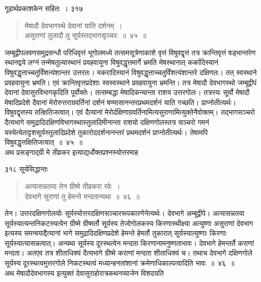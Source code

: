 \documentclass[11pt, openany]{book}
\begin{document}
\newpage


\hspace{3cm} गूढार्थप्रकाशकेन सहितः~। \hfill ३१७
\vspace{1cm}


\begin{quote}
 {\ssi मेषादौ देवभागस्थे देवानां याति दर्शनम्~।\\ 
असुराणां तुलादौ तु सूर्यस्तद्भागसृञ्चरः~॥~४५~॥}
\end{quote}

 जम्बूद्वीपलवणसमुद्रसन्धौ परिधिवृत्तं भूगोलमध्मे तत्समसूत्रेणाकाशे वृत्तं विषुवद्वृत्तं तत्र क्रान्तिवृत्तं षड्भान्तरेण स्थानद्वये लग्नं तन्मेषतुल्यास्थानं प्रवहवायुना विषुवद्धृत्तमार्गे भ्रमति मेषस्थानात् कर्कादिस्यानं विषुवद्धृत्ताच्चतुर्विंशत्यंशान्तर उत्तरतः। मकरादिस्यानं विषुवद्धृत्ताच्चतुर्विंशत्यंशान्तरे दक्षिणतः। तत् स्वस्थाने प्रवहवायुना भ्रमति। एवं क्रान्तिवृत्तप्रदेशाः स्वस्वस्थाने प्रवहवायुना भ्रमन्ति। तत्र मेषादौ देवभागस्थो जम्बूद्वीपं देवानां देवासुरविभागकृदिति पूर्वोक्तेः। तत्सम्बद्धा मेषादिकन्यान्ता राशय उत्तरगोलः। तत्रस्यः सूर्यो मेषादौ मेषादिप्रदेशे दैवानां मेरोरुत्तराग्रवर्तिनां दर्शनं षण्मासानन्तरप्रथमदर्शनं याति गच्छति। प्राप्नोतीत्यर्थः। विषुवद्वृत्तस्य तत्क्षितिजत्वात्। एवं दैत्यानां मेरोर्दक्षिणाग्रवर्तिनामित्यसुराणामित्युक्तेनैवोक्तम्। तद्भागसञ्चरो दैत्यभागे समुद्रादिदक्षिणविभागस्थास्तुलादिमीनान्ता राशयो दक्षिणगोलस्तत्र सञ्चरो गमनं यस्येत्येताट्टशसूर्यस्तुलादिप्रदेशे तुकारोददर्शनानन्तरं प्रथमदर्शनं प्राप्नोतीत्यर्थः। तेषामपि विषुवद्धृत्तक्षितिजत्वात्~॥~४५~॥\\
\noindent अथ प्रसङ्गाद्ग्री मे तीव्रकर इत्याद्यर्धोक्तप्रश्नस्योत्तरमाह\textendash 



\newpage


\noindent ३१८ \hspace{4cm} सूर्यसिद्धान्तः
\vspace{1cm}


\begin{quote}
  {\ssi अत्यासन्नतया तेन ग्रीष्मे तीव्रकरा रवेः~।\\
देवभागे सुराणां तु हेमन्ते मन्दतान्यथा~॥~४६~॥}
\end{quote}


 तेन। उत्तरदक्षिणगोलयोः सूर्यस्योत्तरदक्षिणसञ्चाररूपकारणेनेत्यर्थः। देवभागे अम्बूद्वीपे। अत्यासन्नतया सूर्यस्यात्यन्तनिकटस्यत्वेन ग्रीष्मे ग्रीष्मर्तौ सूर्यस्य तेजोगोलकस्य किरणास्थीक्ष्या अत्युष्णा असुराणां देवभाग इत्यस्य समन्वयाद्दैत्यानां भागे समुद्रादिदक्षिणप्रदेशे हेमन्ते हेमर्तौ तुकारात् सूर्यस्यात्युष्णाः किरणाः सूर्यस्यात्यासन्नत्वात्। अन्यथा सूर्यस्य दूरस्थत्वेन मन्दता किरणानामनुष्णताभावः। देवभागे हेमन्तर्तै कराणां मन्दता। अतएव तत्र शीताधिक्यं दैत्यभागे ग्रीष्मे कराणां मन्दता शीताधिक्यं च। तथाच देवभागे दक्षिणगोले सूर्यस्य दूरस्थत्वमुत्तरगोले निकटस्थत्वं मध्यान्हनतांशानां क्रमेणाधिकाल्पत्वादिति भावः~॥~४६~॥\\
\noindent अथ मेषादौदेवभागस्य इत्युक्तं देवासुराहोरात्रकथनव्याजेन विशदयति\textendash 
\end{document}
